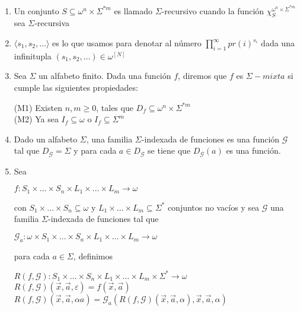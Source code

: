 \documentclass{article}
\begin{document}
\begin{enumerate}
    \item Un conjunto $S \subseteq \omega^n \times \Sigma^{*m}$ 
    es llamado $\Sigma$-recursivo cuando la función $\chi_{S}^{\omega^n \times \Sigma^{*m}}$
    sea $\Sigma$-recursiva
    \item $\langle s_1, s_2, \dots \rangle$ es lo que usamos para denotar al número
    $\displaystyle \prod_{i=1}^{\infty} pr(i)^{s_i}$ dada una infinitupla 
    $(s_1, s_2, \dots) \in \omega^{[N]}$
    \item Sea $\Sigma$ un alfabeto finito. Dada una función $f$, diremos que $f$ es 
    $\Sigma-mixta$ si cumple las siguientes propiedades:
    
        (M1) Existen $n, m \geq 0$, tales que $D_f \subseteq \omega^n \times \Sigma^{*m}$\\
        (M2) Ya sea $I_f \subseteq \omega$ o $I_f \subseteq \Sigma^{m}$
    
    \item Dado un alfabeto $\Sigma$, una familia $\Sigma$-indexada de funciones es una función $\mathcal{G}$ tal que $D_{\mathcal{G}} = \Sigma$ y para cada
    $a \in D_{\mathcal{G}}$ se tiene que $D_{\mathcal{G}}(a)$ es una función.
    \item Sea
    \begin{center}
        $f : S_1 \times \dots \times S_n \times L_1 \times \dots \times L_m \rightarrow \omega$ 
    \end{center}
    con $S_1 \times \dots \times S_n \subseteq \omega$ y $L_1 \times \dots \times L_m \subseteq \Sigma^{*}$
    conjuntos no vacíos y sea $\mathcal{G}$ una familia $\Sigma$-indexada de funciones
    tal que 
    \begin{center}
        $\mathcal{G}_a : \omega \times S_1 \times \dots \times S_n \times L_1 \times \dots \times L_m \rightarrow \omega$
    \end{center}
    para cada $a \in \Sigma$, definimos
    \begin{center}
        $R(f, \mathcal{G}) : S_1 \times \dots \times S_n \times L_1 \times \dots \times L_m 
        \times \Sigma^{*} \rightarrow \omega$ \\
        $R(f, \mathcal{G}) (\overset{\rightarrow}{x}, \overset{\rightarrow}{a}, \varepsilon) = 
        f(\overset{\rightarrow}{x}, \overset{\rightarrow}{a})$ \\
        $R(f, \mathcal{G}) (\overset{\rightarrow}{x}, \overset{\rightarrow}{a}, \alpha a) = 
        \mathcal{G}_a(R(f, \mathcal{G}) (\overset{\rightarrow}{x}, \overset{\rightarrow}{a}, \alpha), 
        \overset{\rightarrow}{x}, \overset{\rightarrow}{a}, \alpha)$
    \end{center}
\end{enumerate}
\end{document}

